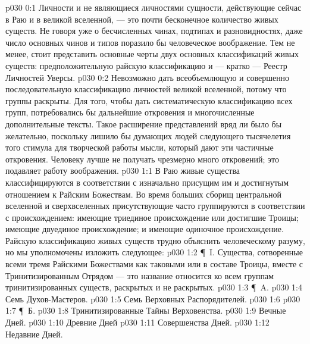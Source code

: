 \author{Могучий Вестник}
\vs p030 0:1 Личности и не являющиеся личностями сущности, действующие сейчас в Раю и в великой вселенной, --- это почти бесконечное количество живых существ. Не говоря уже о бесчисленных чинах, подтипах и разновидностях, даже число основных чинов и типов поразило бы человеческое воображение. Тем не менее, стоит представить основные черты двух основных классификаций живых существ: предположительную райскую классификацию и --- кратко --- Реестр Личностей Уверсы.
\vs p030 0:2 Невозможно дать всеобъемлющую и совершенно последовательную классификацию личностей великой вселенной, потому что  группы раскрыты. Для того, чтобы дать систематическую классификацию всех групп, потребовались бы дальнейшие откровения и многочисленные дополнительные тексты. Такое расширение представлений вряд ли было бы желательно, поскольку лишило бы думающих людей следующего тысячелетия того стимула для творческой работы мысли, который дают эти частичные откровения. Человеку лучше не получать чрезмерно много откровений; это подавляет работу воображения.
\vs p030 1:1 В Раю живые существа классифицируются в соответствии с изначально присущим им и достигнутым отношением к Райским Божествам. Во время больших сборищ центральной вселенной и сверхвселенных присутствующие часто группируются в соответствии с происхождением: имеющие триединое происхождение или достигшие Троицы; имеющие двуединое происхождение; и имеющие одиночное происхождение. Райскую классификацию живых существ трудно объяснить человеческому разуму, но мы уполномочены изложить следующее:
\vs p030 1:2 \P\ I.  Существа, сотворенные всеми тремя Райскими Божествами как таковыми или в составе Троицы, вместе с Тринитизированным Отрядом --- это название относится ко всем группам тринитизированных существ, раскрытых и не раскрытых.
\vs p030 1:3 \P\ A. 
\vs p030 1:4 \bibnobreakspace Семь Духов\hyp{}Мастеров.
\vs p030 1:5 \bibnobreakspace Семь Верховных Распорядителей.
\vs p030 1:6 \bibnobreakspace {}
\vs p030 1:7 \P\ Б. 
\vs p030 1:8 \bibnobreakspace Тринитизированные Тайны Верховенства.
\vs p030 1:9 \bibnobreakspace Вечные Дней.
\vs p030 1:10 \bibnobreakspace Древние Дней
\vs p030 1:11 \bibnobreakspace Совершенства Дней.
\vs p030 1:12 \bibnobreakspace Недавние Дней.
